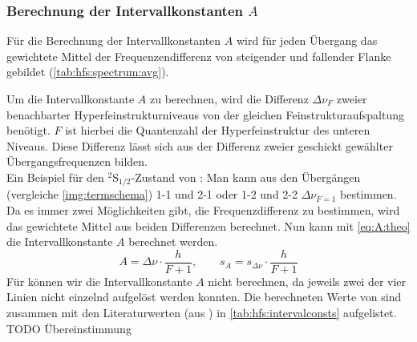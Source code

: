 \subsubsection*{Berechnung der Intervallkonstanten $A$}
Für die Berechnung der Intervallkonstanten $A$ wird für jeden Übergang das gewichtete Mittel der Frequenzendifferenz von steigender und fallender 
Flanke gebildet (\autoref{tab:hfs:spectrum:avg}).

Um die Intervallkonstante $A$ zu berechnen, wird die Differenz $\Delta \nu_F$ zweier benachbarter Hyperfeinstrukturniveaus von der 
gleichen Feinstrukturaufspaltung benötigt. $F$ ist hierbei die Quantenzahl der Hyperfeinstruktur des unteren Niveaus. 
Diese Differenz lässt sich aus der Differenz zweier geschickt gewählter Übergangsfrequenzen bilden. \\
Ein Beispiel für den ${}^2\text{S}_{1/2}$-Zustand von : Man kann aus den Übergängen (vergleiche \autoref{img:termschema}) 
1-1 und 2-1 oder 1-2 und 2-2 $\Delta \nu_{F=1}$ bestimmen. \\
Da es immer zwei Möglichkeiten gibt, die Frequenzdifferenz zu bestimmen, wird das gewichtete Mittel aus beiden Differenzen berechnet. Nun kann mit 
\autoref{eq:A:theo} die Intervallkonstante $A$ berechnet werden. 
\begin{equation}
    A = \Delta \nu \cdot \frac{h}{F + 1}, \qquad s_A = s_{\Delta \nu} \cdot \frac{h}{F + 1}
\end{equation}
Für  können wir die Intervallkonstante $A$ nicht berechnen, da jeweils zwei der vier Linien nicht einzelnd aufgelöst werden konnten. Die 
berechneten Werte von  sind zusammen mit den Literaturwerten (aus \cite{manual}) in \autoref{tab:hfs:intervalconsts} aufgelistet. 
TODO Übereinstimmung %
